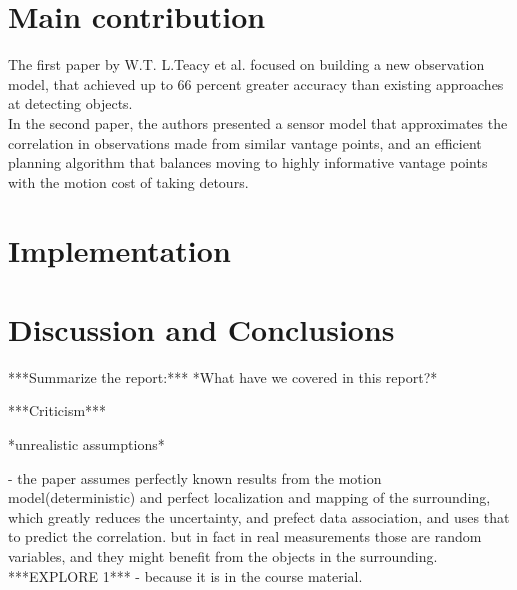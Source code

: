 \documentclass{article}
\begin{document}
	\section{Main contribution}
	The first paper by W.T. L.Teacy et al. focused on building a new observation model, that achieved up to 66 percent greater accuracy than existing approaches at detecting objects. \\
	
	In the second paper, the authors presented a sensor model that approximates the correlation in observations made from similar vantage points, and an efficient planning algorithm that balances moving to highly informative vantage points with the motion cost of taking detours.
	
	\section{Implementation}
	
	\section{Discussion and Conclusions}
	***Summarize the report:***
	*What have we covered in this report?*
	
	***Criticism***
	
	*unrealistic assumptions*
	
	- the paper assumes perfectly known results from the motion model(deterministic) and perfect localization and mapping of the surrounding, which greatly reduces the uncertainty, and prefect data association, and uses that to predict the correlation. but in fact in real measurements those are random variables, and they might benefit from the objects in the surrounding.
	***EXPLORE 1*** - because it is in the course material.
	
\end{document}
